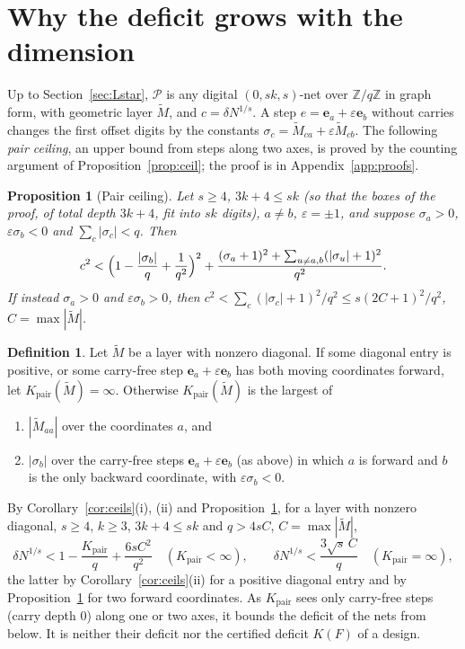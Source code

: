 \documentclass[11pt]{amsart}
\newtheorem{proposition}[theorem]{Proposition}
\theoremstyle{definition}
\newtheorem{definition}[theorem]{Definition}
\theoremstyle{plain}
\newcommand{\Z}{\mathbb{Z}}
\newcommand{\e}{\mathbf{e}}
\begin{document}
\section{Why the deficit grows with the dimension}\label{sec:deficitgrowth}
Up to Section~\ref{sec:Lstar}, $\mathcal P$ is any digital $(0,sk,s)$-net over $\Z/q\Z$ in graph form, with geometric layer $\tilde M$, and $c=\delta N^{1/s}$. A step $e=\e_a+\varepsilon\e_b$ without carries changes the first offset digits by the constants $\sigma_c=\tilde M_{ca}+\varepsilon\tilde M_{cb}$. The following \emph{pair ceiling}, an upper bound from steps along two axes, is proved by the counting argument of Proposition~\ref{prop:ceil}; the proof is in Appendix~\ref{app:proofs}.

\begin{proposition}[Pair ceiling]\label{prop:P2}
Let $s\ge4$, $3k+4\le sk$ (so that the boxes of the proof, of total depth $3k+4$, fit into $sk$ digits), $a\ne b$, $\varepsilon=\pm1$, and suppose $\sigma_a>0$, $\varepsilon\sigma_b<0$ and $\sum_c|\sigma_c|<q$. Then
\[
c^2<\Bigl(1-\frac{|\sigma_b|}q+\frac1{q^2}\Bigr)^2+\frac{(\sigma_a+1)^2+\sum_{u\ne a,b}(|\sigma_u|+1)^2}{q^2}.
\]
If instead $\sigma_a>0$ and $\varepsilon\sigma_b>0$, then $c^2<\sum_c(|\sigma_c|+1)^2/q^2\le s(2C+1)^2/q^2$, $C=\max|\tilde M|$.
\end{proposition}


\begin{definition}\label{def:Ktrue}
Let $\tilde M$ be a layer with nonzero diagonal. If some diagonal entry is positive, or some carry-free step $\e_a+\varepsilon\e_b$ has both moving coordinates forward, let $K_{\mathrm{pair}}(\tilde M)=\infty$. Otherwise $K_{\mathrm{pair}}(\tilde M)$ is the largest of
\begin{enumerate}
\item[(a)] $|\tilde M_{aa}|$ over the coordinates $a$, and
\item[(b)] $|\sigma_b|$ over the carry-free steps $\e_a+\varepsilon\e_b$ (as above) in which $a$ is forward and $b$ is the only backward coordinate, with $\varepsilon\sigma_b<0$.
\end{enumerate}
\end{definition}

By Corollary~\ref{cor:ceils}(i), (ii) and Proposition~\ref{prop:P2}, for a layer with nonzero diagonal, $s\ge4$, $k\ge3$, $3k+4\le sk$ and $q>4sC$, $C=\max|\tilde M|$,
\begin{equation}\label{eq:Kpair}
\delta N^{1/s}<1-\frac{K_{\mathrm{pair}}}q+\frac{6sC^2}{q^2}\quad(K_{\mathrm{pair}}<\infty),\qquad \delta N^{1/s}<\frac{3\sqrt s\,C}q\quad(K_{\mathrm{pair}}=\infty),
\end{equation}
the latter by Corollary~\ref{cor:ceils}(ii) for a positive diagonal entry and by Proposition~\ref{prop:P2} for two forward coordinates. As $K_{\mathrm{pair}}$ sees only carry-free steps (carry depth $0$) along one or two axes, it bounds the deficit of the nets from below. It is neither their deficit nor the certified deficit $K(F)$ of a design.
\end{document}
